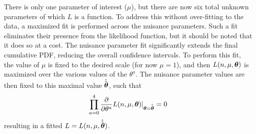     There is only one parameter of interest ($\mu$), but there are now six total unknown parameters of which $L$ is a function.
    To address this without over-fitting to the data, a maximized fit is performed across the nuisance parameters.
    Such a fit eliminates their presence from the likelihood function, but it should be noted that it does so at a cost.
    The nuisance parameter fit significantly extends the final cumulative PDF, reducing the overall confidence intervals.
    To perform this fit, the value of $\mu$ is fixed to the desired scale (for now $\mu=1$),
        and then $L(n,\mu,\boldsymbol{\theta})$ is maximized over the various values of the $\theta^a$.
    The nuisance parameter values are then fixed to this maximal value $\hat{\hat{\boldsymbol{\theta}}}$, such that
    \begin{equation}
        \prod \limits_{a=0}^{4} \frac{\partial}{\partial \theta^a} L(n,\mu,\boldsymbol{\theta}) |_{\boldsymbol{\theta}=\hat{\hat{\boldsymbol{\theta}}}} = 0
    \end{equation}
    resulting in a fitted $L = L(n,\mu,\hat{\hat{\boldsymbol{\theta}}})$.
        
